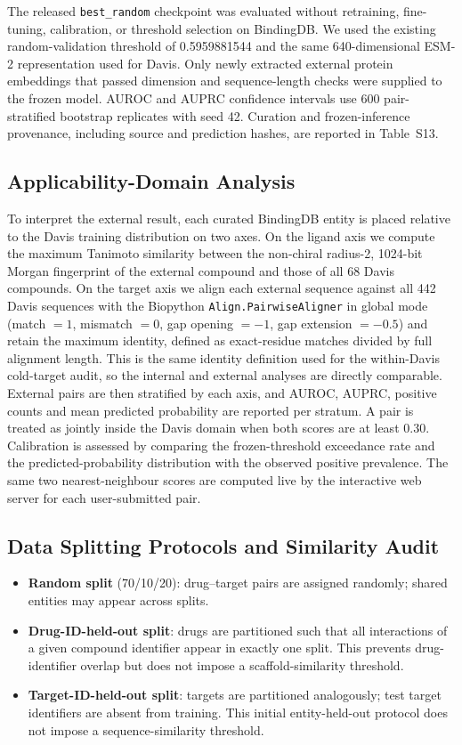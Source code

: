 \documentclass[fleqn,10pt]{wlscirep}
\begin{document}
The released \texttt{best\_random} checkpoint was evaluated without retraining,
fine-tuning, calibration, or threshold selection on BindingDB.  We used the
existing random-validation threshold of 0.5959881544 and the same
640-dimensional ESM-2 representation used for Davis. Only newly extracted
external protein embeddings that passed dimension and sequence-length checks
were supplied to the frozen model.
AUROC and AUPRC confidence intervals use 600 pair-stratified bootstrap
replicates with seed 42.  Curation and frozen-inference provenance, including
source and prediction hashes, are reported in Table~S13.

\subsection{Applicability-Domain Analysis}
\label{sec:ad_methods}

To interpret the external result, each curated BindingDB entity is placed
relative to the Davis training distribution on two axes.  On the ligand axis we
compute the maximum Tanimoto similarity between the non-chiral radius-2,
1024-bit Morgan fingerprint of the external compound and those of all 68 Davis
compounds.  On the target axis we align each external sequence against all 442
Davis sequences with the Biopython \texttt{Align.PairwiseAligner} in global mode
(match $=1$, mismatch $=0$, gap opening $=-1$, gap extension $=-0.5$) and retain
the maximum identity, defined as exact-residue matches divided by full alignment
length.  This is the same identity definition used for the within-Davis
cold-target audit, so the internal and external analyses are directly
comparable.  External pairs are then stratified by each axis, and AUROC, AUPRC,
positive counts and mean predicted probability are reported per stratum.  A pair
is treated as jointly inside the Davis domain when both scores are at least
0.30.  Calibration is assessed by comparing the frozen-threshold exceedance rate
and the predicted-probability distribution with the observed positive
prevalence.  The same two nearest-neighbour scores are computed live by the
interactive web server for each user-submitted pair.

\subsection{Data Splitting Protocols and Similarity Audit}

\begin{itemize}[leftmargin=*]
\item \textbf{Random split} (70/10/20): drug--target pairs are assigned randomly;
  shared entities may appear across splits.
\item \textbf{Drug-ID-held-out split}: drugs are partitioned such that all interactions
  of a given compound identifier appear in exactly one split.  This prevents
  drug-identifier overlap but does not impose a scaffold-similarity threshold.
\item \textbf{Target-ID-held-out split}: targets are partitioned analogously; test
  target identifiers are absent from training.  This initial entity-held-out
  protocol does not impose a sequence-similarity threshold.
\end{itemize}
\end{document}

